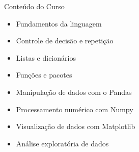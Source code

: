 \begin{frame}[t, fragile]{Conteúdo do Curso}
  \begin{itemize}
    \item Fundamentos da linguagem
    \item Controle de decisão e repetição
    \item Listas e dicionários
    \item Funções e pacotes
    \item Manipulação de dados com o Pandas
    \item Processamento numérico com Numpy
    \item Visualização de dados com Matplotlib
    \item Análise exploratória de dados
  \end{itemize}
\end{frame}

 